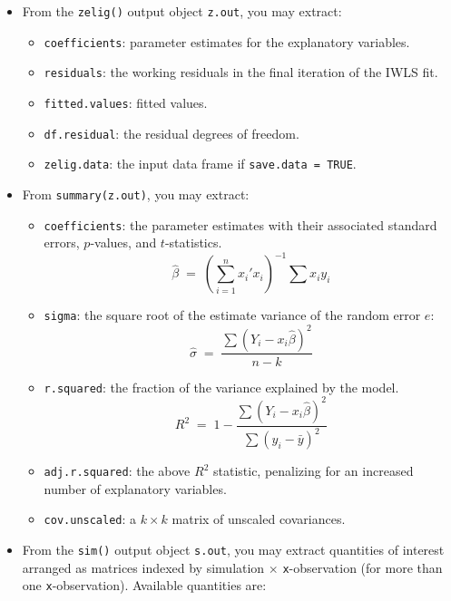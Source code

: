 \begin{itemize}
  \item From the {\tt zelig()} output object {\tt z.out}, you may
  extract:
   \begin{itemize}
   \item {\tt coefficients}: parameter estimates for the explanatory
     variables.
   \item {\tt residuals}: the working residuals in the final iteration
     of the IWLS fit.
   \item {\tt fitted.values}: fitted values.
   \item {\tt df.residual}: the residual degrees of freedom.
   \item {\tt zelig.data}: the input data frame if {\tt save.data = TRUE}.  
   \end{itemize}
  
\item From {\tt summary(z.out)}, you may extract:
   \begin{itemize}
   \item {\tt coefficients}: the parameter estimates with their
     associated standard errors, $p$-values, and $t$-statistics.
     \begin{equation*}
       \hat{\beta} \; = \; \left(\sum_{i=1}^n x_i' x_i\right)^{-1} \sum x_i y_i
     \end{equation*}
   \item {\tt sigma}: the square root of the estimate variance of the
     random error $e$:
     \begin{equation*}
       \hat{\sigma} \; = \; \frac{\sum (Y_i-x_i\hat{\beta})^2}{n-k}
     \end{equation*}
   \item {\tt r.squared}: the fraction of the variance explained by
     the model. 
     \begin{equation*}
       R^2 \; = \; 1 - \frac{\sum (Y_i-x_i\hat{\beta})^2}{\sum (y_i -
         \bar{y})^2} 
     \end{equation*}
   \item {\tt adj.r.squared}: the above $R^2$ statistic, penalizing
     for an increased number of explanatory variables.  
   \item{\tt cov.unscaled}: a $k \times k$ matrix of unscaled
     covariances.  
   \end{itemize}
   
\item From the {\tt sim()} output object {\tt s.out}, you may extract
  quantities of interest arranged as matrices indexed by simulation
  $\times$ {\tt x}-observation (for more than one {\tt x}-observation).
  Available quantities are:


\end{itemize}
